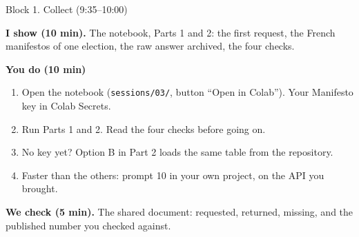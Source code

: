 \begin{frame}{Block 1. Collect (9:35--10:00)}

\small
\textbf{I show (10 min).} The notebook, Parts 1 and 2: the first request, the French manifestos of one election, the raw answer archived, the four checks.

\vspace{0.3cm}

\textbf{You do (10 min)}
\begin{enumerate}
    \setlength{\itemsep}{3pt}
    \item Open the notebook (\texttt{sessions/03/}, button ``Open in Colab''). Your Manifesto key in Colab Secrets.
    \item Run Parts 1 and 2. Read the four checks before going on.
    \item No key yet? Option B in Part 2 loads the same table from the repository.
    \item Faster than the others: prompt 10 in your own project, on the API you brought.
\end{enumerate}

\vspace{0.3cm}

\textbf{We check (5 min).} The shared document: requested, returned, missing, and the published number you checked against.

\end{frame}



